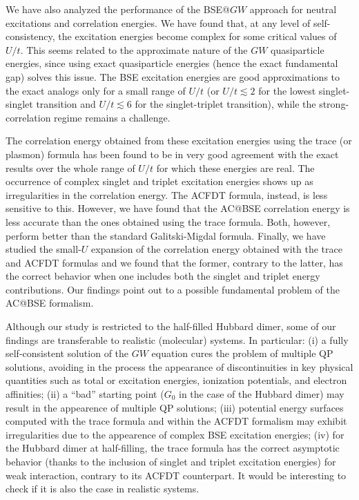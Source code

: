 \documentclass[aps,prb,reprint,superscriptaddress]{revtex4-1}
\begin{document}
We have also analyzed the performance of the BSE@$GW$ approach for neutral excitations and correlation energies. We have found that, at any level of self-consistency, the excitation energies become complex for some critical values of $U/t$. This seems related to the approximate nature of the $GW$ quasiparticle energies, since using exact quasiparticle energies (hence the exact fundamental gap) solves this issue. The BSE excitation energies are good approximations to the exact analogs only for a small range of $U/t$ (or $U/t\lesssim 2$ for the lowest singlet-singlet transition and $U/t\lesssim 6$ for the singlet-triplet transition), while the strong-correlation regime remains a challenge. 

The correlation energy obtained from these excitation energies using the trace (or plasmon) formula has been found to be in very good agreement with the exact results over the whole range of $U/t$ for which these energies are real. The occurrence of complex singlet and triplet excitation energies shows up as irregularities in the correlation energy. The ACFDT formula, instead, is less sensitive to this. However, we have found that the AC@BSE correlation energy is less accurate than the ones obtained using the trace formula. Both, however, perform better than the standard Galitski-Migdal formula. Finally, we have studied the small-$U$ expansion of the correlation energy obtained with the trace and ACFDT formulas and we found that the former, contrary to the latter, has the correct behavior when one includes both the singlet and triplet energy contributions. Our findings point out to a possible fundamental problem of the AC@BSE formalism. 

Although our study is restricted to the half-filled Hubbard dimer, some of our findings are transferable to realistic (molecular) systems. In particular: (i) a fully self-consistent solution of the $GW$ equation cures the problem of multiple QP solutions, avoiding in the process the appearance of discontinuities in key physical quantities such as total or excitation energies, ionization potentials, and electron affinities; (ii) a ``bad'' starting point ($G_0$ in the case of the Hubbard dimer) may result in the appearence of multiple QP solutions; (iii) potential energy surfaces computed with the trace formula and within the ACFDT formalism may exhibit irregularities due to the appearence of complex BSE excitation energies; (iv) for the Hubbard dimer at half-filling, the trace formula has the correct asymptotic behavior (thanks to the inclusion of singlet and triplet excitation energies) for weak interaction, contrary to its ACFDT counterpart. It would be interesting to check if it is also the case in realistic systems.
\end{document}
